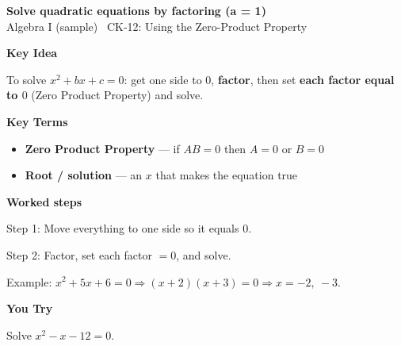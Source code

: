 \documentclass[12pt]{article}
\begin{document}
\begin{center}{\Large \textbf{Solve quadratic equations by factoring (a = 1)}}\\[2pt]{\small Algebra I (sample) \textbar\ CK-12: Using the Zero-Product Property}\end{center}\vspace{0.25cm}

{\large\textbf{Key Idea}}\par\smallskip
To solve $x^2+bx+c=0$: get one side to $0$, \textbf{factor}, then set \textbf{each factor equal to $0$} (Zero Product Property) and solve.\par


{\large\textbf{Key Terms}}\par\smallskip
\begin{itemize}[leftmargin=1.4em]
  \item \textbf{Zero Product Property} — if $AB=0$ then $A=0$ or $B=0$
  \item \textbf{Root / solution} — an $x$ that makes the equation true
\end{itemize}


{\large\textbf{Worked steps}}\par\smallskip
Step 1: Move everything to one side so it equals $0$.\par
Step 2: Factor, set each factor $=0$, and solve.\par
Example: $x^2+5x+6=0\Rightarrow(x+2)(x+3)=0\Rightarrow x=-2,\ -3$.\par


{\large\textbf{You Try}}\par\smallskip
Solve $x^2-x-12=0$.\par
\end{document}
